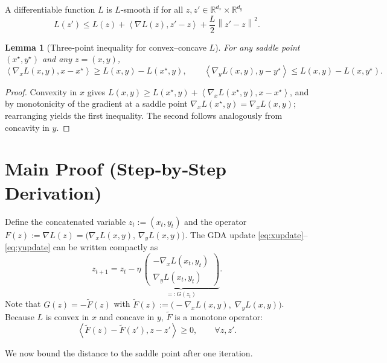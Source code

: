 \documentclass{article}
\newtheorem{lemma}{Lemma}
\newcommand{\norm}[1]{\left\lVert#1\right\rVert}
\newcommand{\inner}[2]{\left\langle #1,#2\right\rangle}
\begin{document}
\begin{definition}\label{def:smooth}
A differentiable function $L$ is $L$‑smooth if for all $z,z'\in\mathbb{R}^{d_x}\times\mathbb{R}^{d_y}$
\[
L(z')\le L(z)+\inner{\nabla L(z)}{z'-z}+\frac{L}{2}\norm{z'-z}^{2}.
\tag{1}
\]
\end{definition}

\begin{lemma}[Three‑point inequality for convex–concave $L$]\label{lem:threepoint}
For any saddle point $(x^{\star},y^{\star})$ and any $z=(x,y)$,
\[
\inner{\nabla_x L(x,y)}{x-x^{\star}} \ge L(x,y)-L(x^{\star},y),\qquad
\inner{\nabla_y L(x,y)}{y-y^{\star}} \le L(x,y)-L(x,y^{\star}).
\tag{2}
\]
\end{lemma}
\begin{proof}
Convexity in $x$ gives $L(x,y)\ge L(x^{\star},y)+\inner{\nabla_x L(x^{\star},y)}{x-x^{\star}}$, and by monotonicity of the gradient at a saddle point $\nabla_x L(x^{\star},y)=\nabla_x L(x,y)$; rearranging yields the first inequality. The second follows analogously from concavity in $y$.
\end{proof}

\section*{Main Proof (Step‑by‑Step Derivation)}
Define the concatenated variable $z_t:=(x_t,y_t)$ and the operator $F(z):=\nabla L(z)=\big(\nabla_x L(x,y),\,\nabla_y L(x,y)\big)$.  
The GDA update \eqref{eq:xupdate}–\eqref{eq:yupdate} can be written compactly as
\[
z_{t+1}=z_t-\eta\,\underbrace{\begin{pmatrix}-\nabla_x L(x_t,y_t)\\ \nabla_y L(x_t,y_t)\end{pmatrix}}_{=:G(z_t)}.
\tag{3}
\]
Note that $G(z) = -\tilde{F}(z)$ with $\tilde{F}(z):=\big(-\nabla_x L(x,y),\;\nabla_y L(x,y)\big)$.  
Because $L$ is convex in $x$ and concave in $y$, $\tilde{F}$ is a monotone operator:
\[
\inner{\tilde{F}(z)-\tilde{F}(z')}{z-z'}\ge 0,\qquad\forall z,z'.
\tag{4}
\]

We now bound the distance to the saddle point after one iteration.
\end{document}
